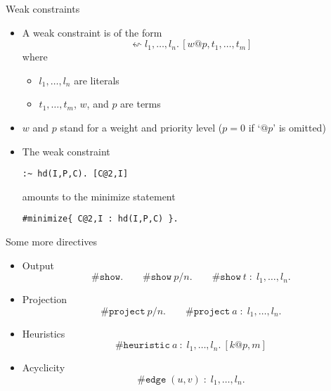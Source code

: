 \begin{frame}[fragile]{Weak constraints}
  \begin{itemize}
  \item {} A \alert{weak constraint} is of the form
    \[
    \leftsquigarrow  l_1,\dots, l_n.\, [ w@p,t_1, \dots, t_m ]
    \]
    where
    \begin{itemize}
    \item $l_1, \dots, l_n$ are literals
    \item $t_1, \dots, t_m$, $w$, and $p$ are terms
    \end{itemize}
  \item<2-> $w$ and $p$ stand for a weight and priority level ($p=0$ if `$@p$' is omitted)
  \item<3-> 
    The weak constraint
\begin{lstlisting}
:~ hd(I,P,C). [C@2,I]
\end{lstlisting}
    \pause[4] amounts to the minimize statement
\begin{lstlisting}
#minimize{ C@2,I : hd(I,P,C) }.
\end{lstlisting}
  \end{itemize}
\end{frame}
\begin{frame}{Some more directives}
  \begin{itemize}
  \item<1-> Output
    \[
      \#\mathtt{show}.\qquad \#\mathtt{show} \ p/n.\qquad \#\mathtt{show} \ t\; :\; l_1,\dots,l_n.
    \]
  \item<2-> Projection
    \[
      \#\mathtt{project} \ p/n.\qquad \#\mathtt{project} \ a\; :\; l_1,\dots,l_n.
    \]
  \item<3-> Heuristics
    \[
      \#\mathtt{heuristic} \ a\ :\; l_1,\dots,l_n. \ [k@p,m]
    \]
  \item<4-> Acyclicity
    \[
      \#\mathtt{edge}\; (u,v)\; :\; l_1,\dots,l_n.
    \]
  \end{itemize}
\end{frame}
%
